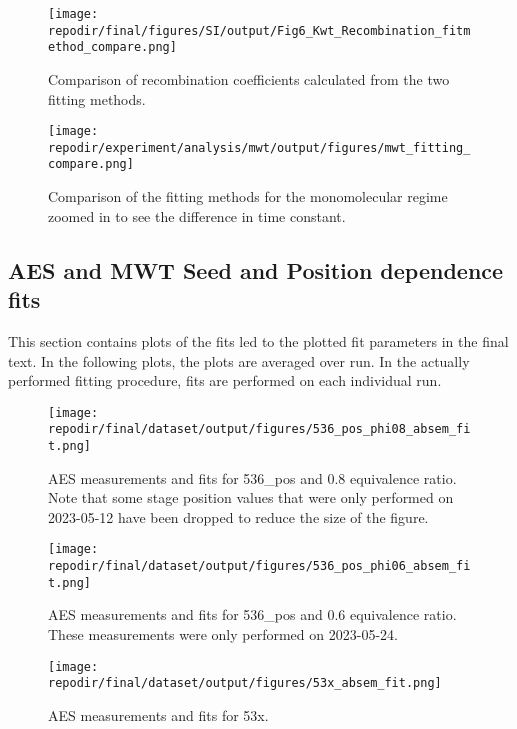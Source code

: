 \begin{figure}[]
\centering
\texttt{[image: \\repodir/final/figures/SI/output/Fig6\_Kwt\_Recombination\_fitmethod\_compare.png]}
\caption{Comparison of recombination coefficients calculated from the two fitting methods.}
\label{fig:SI_Kwt_Recombination_fitmethod_compare}
\end{figure}

\begin{figure}
\centering
\texttt{[image: \\repodir/experiment/analysis/mwt/output/figures/mwt\_fitting\_compare.png]}
\caption{Comparison of the fitting methods for the monomolecular regime zoomed in to see the difference in time constant. }
\label{fig:SI_mwt_fitting_compare}
\end{figure}

\clearpage
\subsection{AES and MWT Seed and Position dependence fits}

This section contains plots of the fits led to the plotted fit parameters in the final text. In the following plots, the plots are averaged over run. In the actually performed fitting procedure, fits are performed on each individual run. 

\begin{figure}[]
\centering
\texttt{[image: \\repodir/final/dataset/output/figures/536\_pos\_phi08\_absem\_fit.png]}
\caption{AES measurements and fits for 536\_pos and 0.8 equivalence ratio. Note that some stage position values that were only performed on 2023-05-12 have been dropped to reduce the size of the figure. }
\label{fig:SI_536_pos_phi08_absem_fit}
\end{figure}

\begin{figure}[]
\centering
\texttt{[image: \\repodir/final/dataset/output/figures/536\_pos\_phi06\_absem\_fit.png]}
\caption{AES measurements and fits for 536\_pos and 0.6 equivalence ratio. These measurements were only performed on 2023-05-24.}
\label{fig:SI_536_pos_phi06_absem_fit}
\end{figure}

\begin{figure}[]
\centering
\texttt{[image: \\repodir/final/dataset/output/figures/53x\_absem\_fit.png]}
\caption{AES measurements and fits for 53x.}
\label{fig:SI_53x_absem_fit}
\end{figure}

